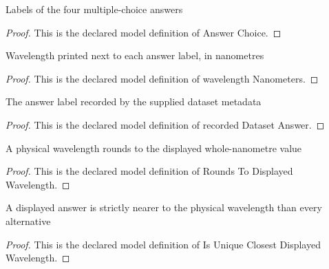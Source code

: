 \begin{definition}
  \label{def:physics:phyx-mini-0637:phyxminiproblems-problemphyxmini0637-answerchoice}
  Labels of the four multiple-choice answers
\end{definition}
\begin{proof}
  This is the declared model definition of Answer Choice.
\end{proof}
\begin{definition}
  \label{def:physics:phyx-mini-0637:phyxminiproblems-problemphyxmini0637-answerchoice-wavelengthnanometers}
  Wavelength printed next to each answer label, in nanometres
\end{definition}
\begin{proof}
  This is the declared model definition of wavelength Nanometers.
\end{proof}
\begin{definition}
  \label{def:physics:phyx-mini-0637:phyxminiproblems-problemphyxmini0637-recordeddatasetanswer}
  The answer label recorded by the supplied dataset metadata
\end{definition}
\begin{proof}
  This is the declared model definition of recorded Dataset Answer.
\end{proof}
\begin{definition}
  \label{def:physics:phyx-mini-0637:phyxminiproblems-problemphyxmini0637-roundstodisplayedwavelength}
  A physical wavelength rounds to the displayed whole-nanometre value
\end{definition}
\begin{proof}
  This is the declared model definition of Rounds To Displayed Wavelength.
\end{proof}
\begin{definition}
  \label{def:physics:phyx-mini-0637:phyxminiproblems-problemphyxmini0637-isuniqueclosestdisplayedwavelength}
  A displayed answer is strictly nearer to the physical wavelength than every alternative
\end{definition}
\begin{proof}
  This is the declared model definition of Is Unique Closest Displayed Wavelength.
\end{proof}
